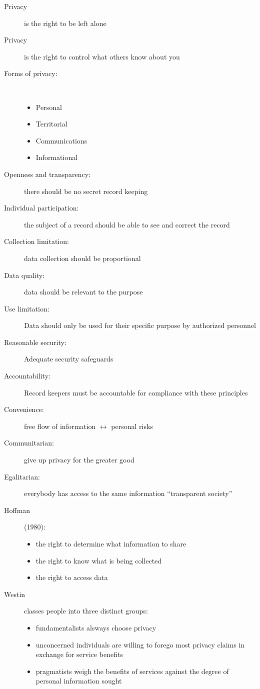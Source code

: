 \documentclass[a4paper]{article}
\begin{document}
\begin{description}
\item[Privacy] is the right to be left alone
\item[Privacy] is the right to control what others know about you
\item[Forms of privacy:] ~
\begin{itemize}
\item Personal
\item Territorial
\item Communications
\item Informational
\end{itemize}
\item[Openness and transparency:] there should be no secret record keeping
\item[Individual participation:] the subject of a record should be able to see and correct the record
\item[Collection limitation:] data collection should be proportional
\item[Data quality:] data should be relevant to the purpose
\item[Use limitation:] Data should only be used for their specific purpose by authorized personnel
\item[Reasonable security:] Adequate security safeguards
\item[Accountability:] Record keepers must be accountable for compliance with these principles
\item[Convenience:] free flow of information $\leftrightarrow$ personal risks
\item[Communitarian:] give up privacy for the greater good
\item[Egalitarian:] everybody has access to the same information ``transparent society''
\item[Hoffman] (1980):
\begin{itemize}
\item the right to determine what information to share
\item the right to know what is being collected
\item the right to access data
\end{itemize}
\item[Westin] classes people into three distinct groups:
\begin{itemize}
\item fundamentalists alsways choose privacy
\item unconcerned individuals are willing to forego most privacy claims in exchange for service benefits
\item pragmatists weigh the benefits of services against the degree of personal information sought
\end{itemize}
\end{description}
\end{document}
